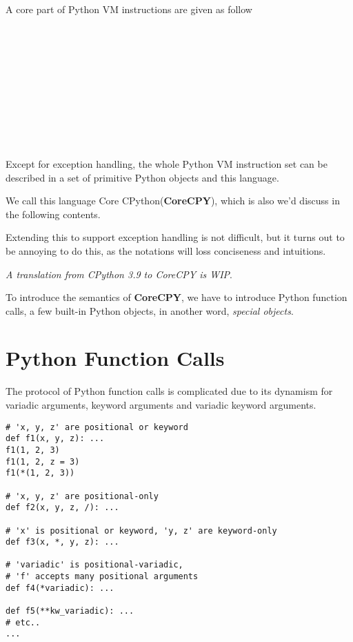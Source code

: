 \documentclass[12pt, a4paper]{report}
\begin{document}
A core part of Python VM instructions are given as follow

\begin{bnf*}
     \\
    \\    
    \\
    \\
    \\
    \\
    \\
     \\
     \\
\end{bnf*}


Except for exception handling, the whole Python VM instruction set can be described in
a set of primitive Python objects and this language.

We call this language Core CPython(\textbf{CoreCPY}), which is also we'd discuss in the following contents.

Extending this to support exception handling is not difficult,
but it turns out to be annoying to do this,
as the notations will loss conciseness and intuitions.

\textit{A translation from CPython 3.9 to CoreCPY is WIP}.

To introduce the semantics of \textbf{CoreCPY},
we have to introduce Python function calls,
a few built-in Python objects, in another word, \textit{special objects}.

\section* {Python Function Calls}

The protocol of Python function calls is complicated due to its dynamism for
variadic arguments, keyword arguments and variadic keyword arguments.

\begin{lstlisting}
# 'x, y, z' are positional or keyword
def f1(x, y, z): ...
f1(1, 2, 3)
f1(1, 2, z = 3)
f1(*(1, 2, 3))

# 'x, y, z' are positional-only
def f2(x, y, z, /): ...

# 'x' is positional or keyword, 'y, z' are keyword-only
def f3(x, *, y, z): ...

# 'variadic' is positional-variadic,
# 'f' accepts many positional arguments
def f4(*variadic): ...

def f5(**kw_variadic): ...
# etc..
... 
\end{lstlisting}
\end{document}
